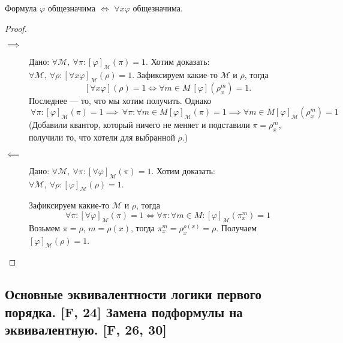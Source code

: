 \documentclass[a4paper, fleqn]{article}
\begin{document}
    \begin{lemma}
        Формула $\varphi$ общезначима $\iff$ $\forall x \varphi$ общезначима.
    \end{lemma}
    
    \begin{proof}~
        \begin{description}
            \item[$\implies$] Дано: $\forall \mathcal{M},~\forall \pi \colon [\varphi]_{\mathcal{M}}(\pi) = 1$.
            Хотим доказать: $\forall \mathcal{M},~\forall \rho \colon [\forall x \varphi]_{\mathcal{M}}(\rho) = 1$.
            Зафиксируем какие-то $\mathcal{M}$ и $\rho$, тогда
            $$
                [\forall x \varphi](\rho) = 1 \iff \forall m \in M~ [\varphi]\left(\rho_{x}^{m}\right) = 1.
            $$
            Последнее --- то, что мы хотим получить. Однако 
            $$
                ~\forall \pi \colon [\varphi]_{\mathcal{M}}(\pi) = 1 \implies
                ~\forall \pi \colon \forall m \in M [\varphi]_{\mathcal{M}}(\pi) = 1 \implies
                \forall m \in M [\varphi]_{\mathcal{M}}(\rho_{x}^{m}) = 1
            $$
            (Добавили квантор, который ничего не меняет и подставили $\pi = \rho_{x}^{m}$, получили
            то, что хотели для выбранной $\rho$.)
            
            \item[$\impliedby$] Дано: $\forall \mathcal{M},~\forall \pi \colon [\forall\varphi]_{\mathcal{M}}(\pi) = 1$.
            Хотим доказать: $\forall \mathcal{M},~\forall \rho \colon [\varphi]_{\mathcal{M}}(\rho) = 1$.

            Зафиксируем какие-то $\mathcal{M}$ и $\rho$, тогда
            $$
                \forall \pi \colon [\forall\varphi]_{\mathcal{M}}(\pi) = 1 \iff
                \forall \pi \colon \forall m \in M \colon [\varphi]_{\mathcal{M}}\left(\pi_{x}^{m}\right) = 1
            $$
            Возьмем $\pi = \rho$, $m = \rho(x)$, тогда $\pi_{x}^{m} = \rho_{x}^{\rho(x)} = \rho$. 
            Получаем $[\varphi]_{\mathcal{M}}(\rho) = 1$.
        \end{description}
    \end{proof}

    \subsection{Основные эквивалентности логики первого порядка. [F, 24] Замена подформулы на эквивалентную. [F, 26, 30]}
\end{document}
